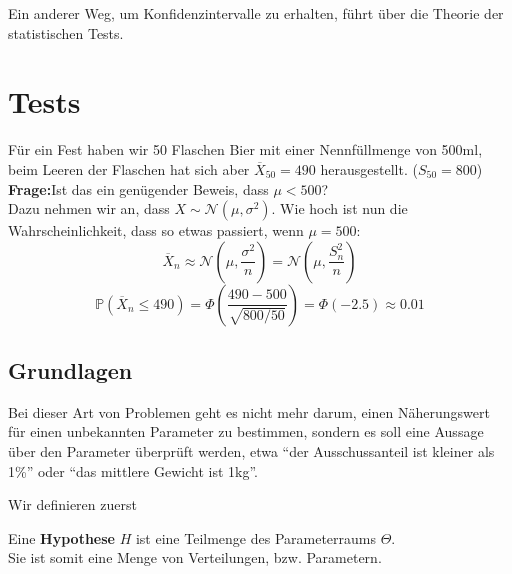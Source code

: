 Ein anderer Weg, um Konfidenzintervalle zu erhalten, führt über die
Theorie der statistischen Tests.

\section{Tests}
\begin{bsp}
Für ein Fest haben wir 50 Flaschen Bier mit einer Nennfüllmenge von 500ml, beim Leeren der Flaschen hat sich aber $\overline X_{50}=490$ herausgestellt. ($S_{50}=800$)\\
\textbf{Frage:}Ist das ein genügender Beweis, dass $\mu<500$?\\
Dazu nehmen wir an, dass $X\sim\mathcal{N}(\mu,\sigma^2)$. Wie hoch ist nun die Wahrscheinlichkeit, dass so etwas passiert, wenn $\mu=500$:
\[\overline X_n\approx\mathcal N\left(\mu,\frac{\sigma^2}{n}\right)=\mathcal{N}\left(\mu,\frac{S_n^2}{n}\right)\]
\[\mathbb{P}(\overline X_n\leq 490)=\Phi\left(\frac{490-500}{\sqrt{800/50}}\right)=\Phi(-2.5)\approx 0.01\]
\end{bsp}
\subsection{Grundlagen}
Bei dieser Art von Problemen geht es nicht mehr darum, einen Näherungswert
für einen unbekannten Parameter zu bestimmen, sondern es soll eine Aussage
über den Parameter überprüft werden, etwa ``der Ausschussanteil ist kleiner
als 1\%'' oder ``das mittlere Gewicht ist 1kg''. 

Wir definieren zuerst
\begin{definition}
Eine \textbf{Hypothese} $H$ ist eine Teilmenge des Parameterraums $\Theta$. \\
Sie ist somit eine Menge von Verteilungen, bzw. Parametern.
\end{definition}

